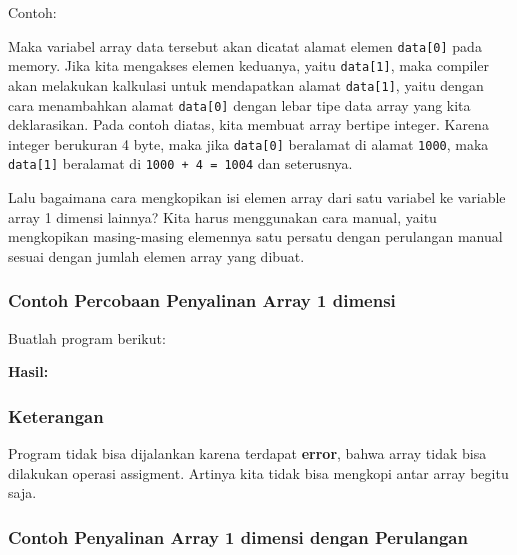 Contoh:



Maka variabel array data tersebut akan dicatat alamat elemen
\texttt{data{[}0{]}} pada memory. Jika kita mengakses elemen keduanya,
yaitu \texttt{data{[}1{]}}, maka compiler akan melakukan kalkulasi untuk
mendapatkan alamat \texttt{data{[}1{]}}, yaitu dengan cara menambahkan
alamat \texttt{data{[}0{]}} dengan lebar tipe data array yang kita
deklarasikan. Pada contoh diatas, kita membuat array bertipe integer.
Karena integer berukuran 4 byte, maka jika \texttt{data{[}0{]}}
beralamat di alamat \texttt{1000}, maka \texttt{data{[}1{]}} beralamat
di \texttt{1000\ +\ 4\ =\ 1004} dan seterusnya.

Lalu bagaimana cara mengkopikan isi elemen array dari satu variabel ke
variable array 1 dimensi lainnya? Kita harus menggunakan cara manual,
yaitu mengkopikan masing-masing elemennya satu persatu dengan perulangan
manual sesuai dengan jumlah elemen array yang dibuat.

\subsubsection*{Contoh Percobaan Penyalinan Array 1 dimensi}

Buatlah program berikut:



\textbf{Hasil:}

\begin{figure}[htbp]
\centering
{}

\end{figure}

\subsubsection*{Keterangan}

Program tidak bisa dijalankan karena terdapat \textbf{error}, bahwa
array tidak bisa dilakukan operasi assigment. Artinya kita tidak bisa
mengkopi antar array begitu saja.

\subsubsection*{Contoh Penyalinan Array 1 dimensi dengan Perulangan}

